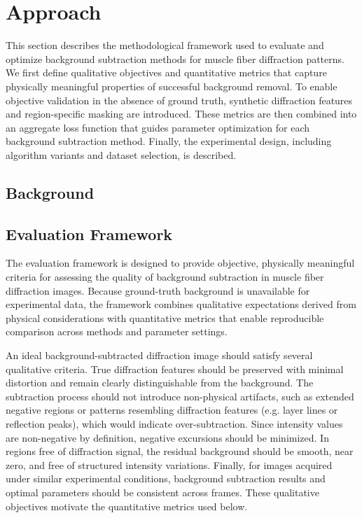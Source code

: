 \documentclass[iucr]{iucrjournals}
\begin{document}
\section{Approach}

This section describes the methodological framework used to evaluate and optimize background subtraction methods for muscle fiber diffraction patterns. We first define qualitative objectives and quantitative metrics that capture physically meaningful properties of successful background removal. To enable objective validation in the absence of ground truth, synthetic diffraction features and region-specific masking are introduced. These metrics are then combined into an aggregate loss function that guides parameter optimization for each background subtraction method. Finally, the experimental design, including algorithm variants and dataset selection, is described.


\subsection{Background}



\subsection{Evaluation Framework}

The evaluation framework is designed to provide objective, physically meaningful criteria for assessing the quality of background subtraction in muscle fiber diffraction images. Because ground-truth background is unavailable for experimental data, the framework combines qualitative expectations derived from physical considerations with quantitative metrics that enable reproducible comparison across methods and parameter settings.


An ideal background-subtracted diffraction image should satisfy several qualitative criteria. True diffraction features should be preserved with minimal distortion and remain clearly distinguishable from the background. The subtraction process should not introduce non-physical artifacts, such as extended negative regions or patterns resembling diffraction features (e.g. layer lines or reflection peaks), which would indicate over-subtraction. Since intensity values are non-negative by definition, negative excursions should be minimized. In regions free of diffraction signal, the residual background should be smooth, near zero, and free of structured intensity variations. Finally, for images acquired under similar experimental conditions, background subtraction results and optimal parameters should be consistent across frames. These qualitative objectives motivate the quantitative metrics used below.
\end{document}
